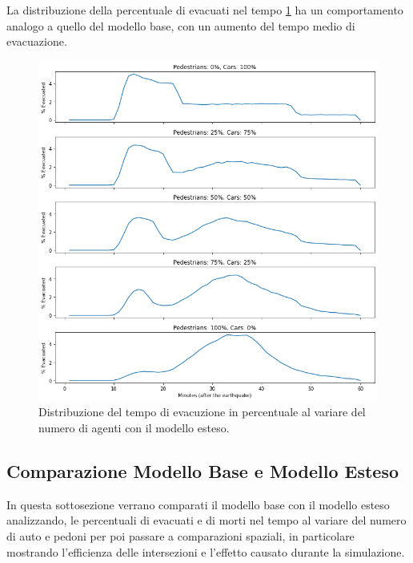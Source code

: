 \pagebreak

La distribuzione della percentuale di evacuati nel tempo \ref*{fig:analisi-new-evtimes} ha un comportamento analogo a quello del modello base, con un aumento del tempo medio di evacuazione.

\begin{figure}
    \centering
    \includegraphics[width=\textwidth]{images/analisi/new-evtimes.png}
    \caption{Distribuzione del tempo di evacuzione in percentuale al variare del numero di agenti con il modello esteso.}
    \label{fig:analisi-new-evtimes}
\end{figure}

\pagebreak

\subsection{Comparazione Modello Base e Modello Esteso}
In questa sottosezione verrano comparati il modello base con il modello esteso analizzando,
le percentuali di evacuati e di morti nel tempo al variare del numero di auto e pedoni per poi passare a comparazioni spaziali,
in particolare mostrando l'efficienza delle intersezioni e l'effetto causato durante la simulazione.


